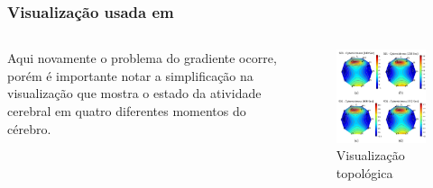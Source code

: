 \begin{frame}
	\frametitle{Visualização usada em \cite{8937083}}
	\begin{columns}
		\begin{column}{0.6	\textwidth}
			\par Aqui novamente o problema do gradiente ocorre, porém é importante notar a simplificação na visualização que mostra o estado da atividade cerebral em quatro diferentes momentos do cérebro.
		\end{column}
		\begin{column}{0.4\textwidth}
			\begin{figure}
				\centering
				\includegraphics[width=\linewidth]{images/visu02}
				\caption{Visualização topológica}
				\label{fig:visu02}
			\end{figure}
		\end{column}
	\end{columns}
	
\end{frame}